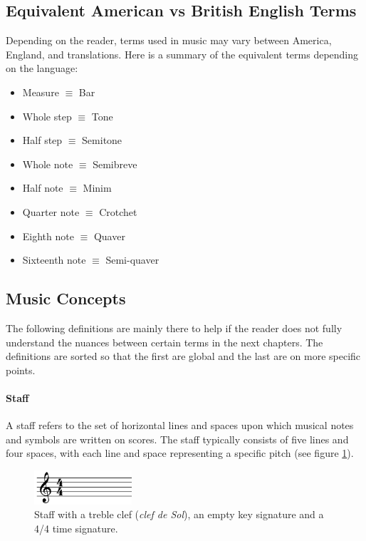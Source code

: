 \subsection{Equivalent American vs British English Terms}
Depending on the reader, terms used in music may vary between America, England, and translations. Here is a summary of the equivalent terms depending on the language:
\begin{multicols}{2}
    \begin{itemize}
        \item Measure $\equiv$ Bar
        \item Whole step $\equiv$ Tone
        \item Half step $\equiv$ Semitone
        \item Whole note $\equiv$ Semibreve
        \item Half note $\equiv$ Minim
        \item Quarter note $\equiv$ Crotchet
        \item Eighth note $\equiv$ Quaver
        \item Sixteenth note $\equiv$ Semi-quaver
    \end{itemize}
\end{multicols}

\subsection{Music Concepts}\label{sec:musictheory:terms}
The following definitions are mainly there to help if the reader does not fully understand the nuances between certain terms in the next chapters. The definitions are sorted so that the first are global and the last are on more specific points.

\paragraph{Staff}
A staff refers to the set of horizontal lines and spaces upon which musical notes and symbols are written on scores. The staff typically consists of five lines and four spaces, with each line and space representing a specific pitch (see figure \ref{fig:theorystaff}).
\begin{figure}[h]
    \centering
    \includegraphics[height=0.5in]{Images/staff.png}
    \caption{Staff with a treble clef (\textit{clef de Sol}), an empty key signature and a 4/4 time signature.}
    \label{fig:theorystaff}
\end{figure}

